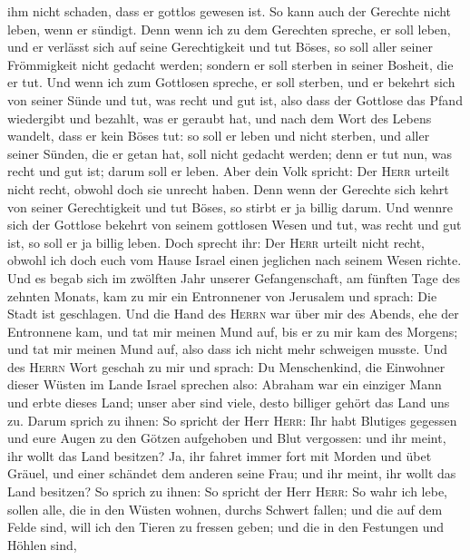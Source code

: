 ihm nicht schaden, dass er gottlos gewesen ist. So kann auch der
Gerechte nicht leben, wenn er sündigt.  Denn wenn ich zu
dem Gerechten spreche, er soll leben, und er verlässt sich auf seine
Gerechtigkeit und tut Böses, so soll aller seiner Frömmigkeit nicht
gedacht werden; sondern er soll sterben in seiner Bosheit, die er tut.
 Und wenn ich zum Gottlosen spreche, er soll sterben, und
er bekehrt sich von seiner Sünde und tut, was recht und gut ist,
 also dass der Gottlose das Pfand wiedergibt und bezahlt,
was er geraubt hat, und nach dem Wort des Lebens wandelt, dass er kein
Böses tut: so soll er leben und nicht sterben,  und aller
seiner Sünden, die er getan hat, soll nicht gedacht werden; denn er tut
nun, was recht und gut ist; darum soll er leben.  Aber
dein Volk spricht: Der \textsc{Herr} urteilt nicht recht, obwohl doch
sie unrecht haben.  Denn wenn der Gerechte sich kehrt von
seiner Gerechtigkeit und tut Böses, so stirbt er ja billig darum.
 Und wennre sich der Gottlose bekehrt von seinem
gottlosen Wesen und tut, was recht und gut ist, so soll er ja billig
leben.  Doch sprecht ihr: Der \textsc{Herr} urteilt nicht
recht, obwohl ich doch euch vom Hause Israel einen jeglichen nach seinem
Wesen richte.  Und es begab sich im zwölften Jahr unserer
Gefangenschaft, am fünften Tage des zehnten Monats, kam zu mir ein
Entronnener von Jerusalem und sprach: Die Stadt ist geschlagen.
 Und die Hand des \textsc{Herrn} war über mir des Abends,
ehe der Entronnene kam, und tat mir meinen Mund auf, bis er zu mir kam
des Morgens; und tat mir meinen Mund auf, also dass ich nicht mehr
schweigen musste.  Und des \textsc{Herrn} Wort geschah zu
mir und sprach:  Du Menschenkind, die Einwohner dieser
Wüsten im Lande Israel sprechen also: Abraham war ein einziger Mann und
erbte dieses Land; unser aber sind viele, desto billiger gehört das Land
uns zu.  Darum sprich zu ihnen: So spricht der Herr
\textsc{Herr}: Ihr habt Blutiges gegessen und eure Augen zu den Götzen
aufgehoben und Blut vergossen: und ihr meint, ihr wollt das Land
besitzen?  Ja, ihr fahret immer fort mit Morden und übet
Gräuel, und einer schändet dem anderen seine Frau; und ihr meint, ihr
wollt das Land besitzen?  So sprich zu ihnen: So spricht
der Herr \textsc{Herr}: So wahr ich lebe, sollen alle, die in den Wüsten
wohnen, durchs Schwert fallen; und die auf dem Felde sind, will ich den
Tieren zu fressen geben; und die in den Festungen und Höhlen sind,
